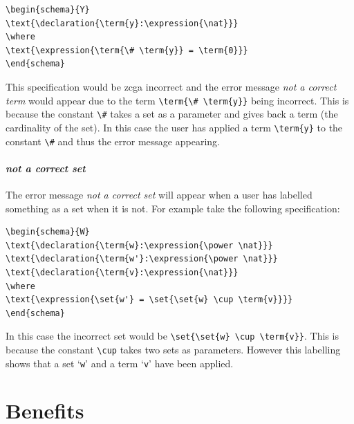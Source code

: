 \begin{exam}
\begin{verbatim}       
\begin{schema}{Y}
\text{\declaration{\term{y}:\expression{\nat}}}
\where
\text{\expression{\term{\# \term{y}} = \term{0}}}
\end{schema}
\end{verbatim}
\end{exam}

This specification would be \gls{zcga} incorrect and the error message \emph{not a correct term} would appear due to the term \verb|\term{\# \term{y}}| being incorrect. This is because the constant \verb|\#| takes a set as a parameter and gives back a term (the cardinality of the set). In this case the user has applied a term \verb|\term{y}| to the constant \verb|\#| and thus the error message appearing.

\paragraph{\emph{not a correct set}}

The error message \emph{not a correct set} will appear when a user has labelled something as a set when it is not. For example take the following specification:

\begin{exam}
\begin{verbatim}       
\begin{schema}{W}
\text{\declaration{\term{w}:\expression{\power \nat}}}
\text{\declaration{\term{w'}:\expression{\power \nat}}}
\text{\declaration{\term{v}:\expression{\nat}}}
\where
\text{\expression{\set{w'} = \set{\set{w} \cup \term{v}}}}
\end{schema}
\end{verbatim}
\end{exam}

In this case the incorrect set would be \verb|\set{\set{w} \cup \term{v}}|. This is because the constant \verb|\cup| takes two sets as parameters. However this labelling shows that a set `\verb|w|' and a term `\verb|v|' have been applied. 


\section{Benefits}

